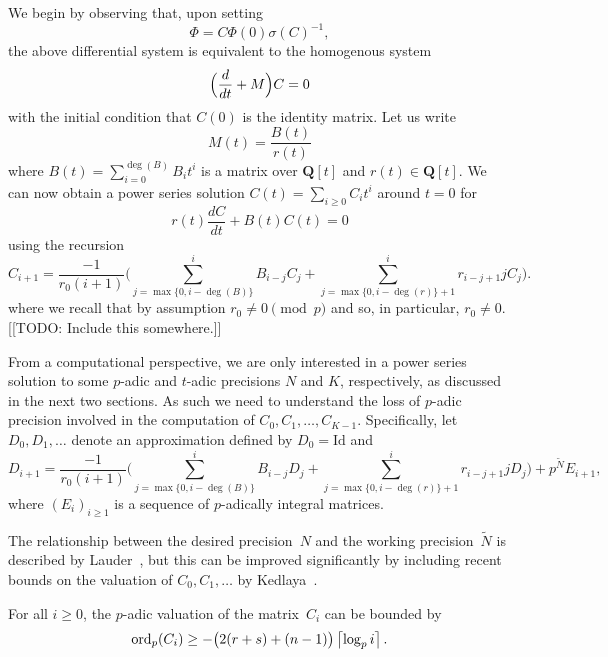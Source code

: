 We begin by observing that, upon setting 
\begin{equation}
\Phi = C \Phi(0) \sigma(C)^{-1},
\end{equation}
the above differential system is equivalent to the homogenous system 
\begin{equation} \label{eq:de}
\Bigl(\frac{d}{dt} + M\Bigr) C = 0
\end{equation}
with the initial condition that $C(0)$ is the identity matrix.  Let us write 
\begin{equation}
M(t) = \frac{B(t)}{r(t)}
\end{equation}
where $B(t) = \sum_{i=0}^{\deg(B)} B_i t^i$ is a matrix over $\mathbf{Q}[t]$ 
and $r(t) \in \mathbf{Q}[t]$.  We can now obtain a power series solution 
$C(t) = \sum_{i \geq 0} C_i t^i$ around $t=0$ for 
\begin{equation}
r(t) \frac{dC}{dt} + B(t) C(t) = 0
\end{equation}
using the recursion 
\begin{equation}
C_{i+1} = \frac{-1}{r_0 (i+1)} \biggl(
    \sum_{j=\max{\{0,i-\deg(B)\}}}^i B_{i-j} C_j + 
    \sum_{j=\max{\{0,i-\deg(r)\}}+1}^i r_{i-j+1} j C_j \biggr).
\end{equation}
where we recall that by assumption $r_0 \neq 0 \pmod{p}$ and so, 
in particular, $r_0 \neq 0$.  [[TODO:  Include this somewhere.]]

From a computational perspective, we are only interested in a power 
series solution to some $p$-adic and $t$-adic precisions $N$ and $K$, 
respectively, as discussed in the next two sections.  As such we need 
to understand the loss of $p$-adic precision involved in the computation 
of $C_0, C_1, \dotsc, C_{K-1}$.  Specifically, let $D_0, D_1, \dotsc$ 
denote an approximation defined by $D_0 = \text{Id}$ and 
\begin{equation}
D_{i+1} = \frac{-1}{r_0 (i+1)} \biggl(
    \sum_{j=\max{\{0,i-\deg(B)\}}}^i B_{i-j} D_j + 
    \sum_{j=\max{\{0,i-\deg(r)\}}+1}^i r_{i-j+1} j D_j \biggr) + 
    p^{\tilde{N}} E_{i+1},
\end{equation}
where $(E_i)_{i \geq 1}$ is a sequence of $p$-adically integral matrices. 

The relationship between the desired precision~$N$ and the working 
precision~$\tilde{N}$ is described by Lauder~\citep[Theorem~5.1]{Lauder2006}, 
but this can be improved significantly by including recent bounds on the 
valuation of $C_0, C_1, \dotsc$ by Kedlaya~\citep{Kedlaya2010}.

\begin{thm} \label{thm:valC}
For all $i \geq 0$, the $p$-adic valuation of the matrix~$C_i$ 
can be bounded by 
\begin{equation}
\operatorname{ord}_p(C_i) \geq - \bigl(2 (r + s) + (n - 1)\bigr) \left\lceil\log_p i\right\rceil.
\end{equation}
\end{thm}

